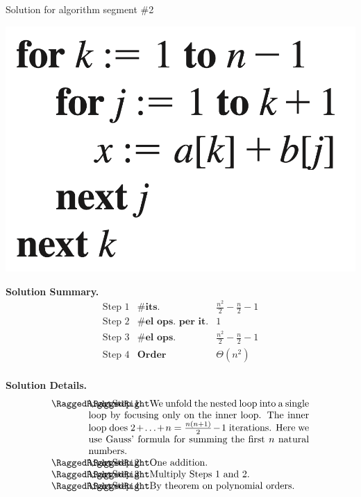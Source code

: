 \documentclass[10pt]{beamer}
\begin{document}
\begin{frame}{Solution for algorithm segment \#2}
\footnotesize 
\begin{center}
    \includegraphics[width=.3\linewidth]{images/epp_hw_11}%
\end{center}

\colorbox{green!30}{\textbf{Solution Summary.}}
\[ 
\begin{array}{lll}
\text{Step 1} & \textbf{\# its.} & \frac{n^2}{2} - \frac{n}{2}-1 \\
\text{Step 2} & \textbf{\# el ops. per it.} & 1 \\
\text{Step 3}& \textbf{\# el ops.} & \frac{n^2}{2} - \frac{n}{2}-1 \\
\text{Step 4} & \textbf{Order} & \Theta(n^2) \\
\end{array}
\]

\colorbox{red!30}{\textbf{Solution Details.}}
\[
\begin{array}{>{\RaggedRight\arraybackslash}p{1cm}>{\RaggedRight\arraybackslash}p{8cm}}
\text{Step 1} &  We unfold the nested loop into a single loop by focusing only on the inner loop. The inner loop does $2+ \hdots +n = \frac{n(n+1)}{2} -1$ iterations. Here we use Gauss' formula for summing the first $n$ natural numbers. \\
\text{Step 2} &  One addition. \\
\text{Step 3}& Multiply Steps 1 and 2. \\
\text{Step 4} & By theorem on polynomial orders. \\
\end{array}
\]
\end{frame}
\end{document}
